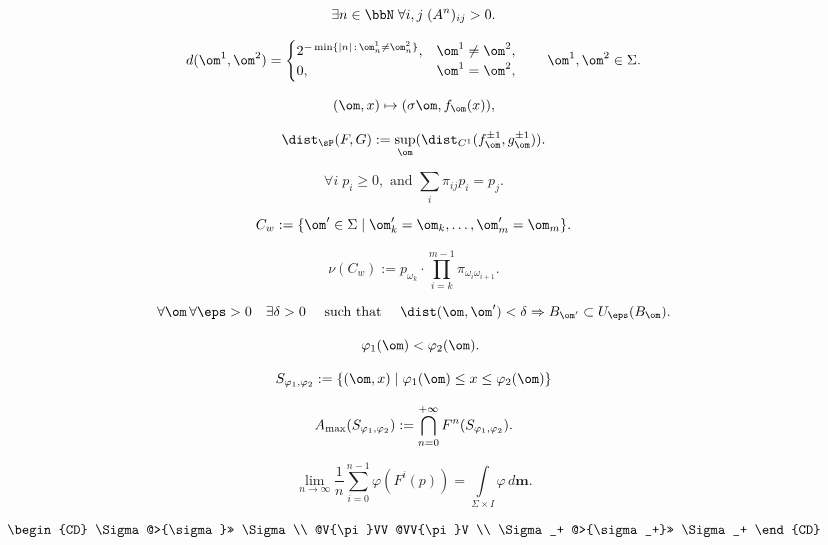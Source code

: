 \documentclass[a4paper,12pt]{article}
\begin{document}
$$
\exists n \in \bbN \; \forall i,j \; (A^n)_{ij} > 0.
$$

\begin{equation}    \label{e:markov_metric}
d (\om^1, \om^2) = \begin{cases}
2^{-\min\{|n| \, : \, \om_n^1\neq \om_n^2 \}}, &  \om^1 \neq \om^2, \\
0, &   \om^1 = \om^2,
\end{cases}
\qquad \om^1,\om^2 \in \Sigma.
\end{equation}

$$
(\om, x) \mapsto (\sigma \om, f_{\om} (x)),
$$

$$
\dist_\sP (F,G) := \sup_\om (\dist_{C^1} (f_\om^{\pm 1}, g_\om^{\pm 1})).
$$

\begin{equation}    \label{e:vector_p}
\forall i \; p_i \ge 0, \text{ and } \sum_i \pi_{ij} p_i = p_j.
\end{equation}

$$
C_w := \{ \om' \in \Sigma \mid \om_k' = \om_k, \ldots, \om_m' = \om_m \}.
$$

\begin{equation}    \label{e:markov_measure}
\nu(C_w) := p_{\omega_{k}} \cdot \prod\limits_{i=k}^{m-1} \pi_{\omega_{i} \omega_{i+1}}.
\end{equation}

$$
\forall \om \, \forall \eps > 0 \quad \exists \delta > 0 \quad \text{ such that } \quad \dist(\om, \om') < \delta \Rightarrow B_{\om'} \subset U_\eps (B_\om).
$$

$$
\quad \varphi_1(\om) < \varphi_2 (\om).
$$

$$
S_{\varphi_1, \varphi_2} := \{ (\om,x) \mid \varphi_1(\om) \le x \le \varphi_2(\om) \}
$$

\begin{equation}    \label{e:Amax}
A_{\textup{max}}(S_{\varphi_1, \varphi_2}) := \bigcap_{n=0}^{+\infty} F^n (S_{\varphi_1, \varphi_2}).
\end{equation}

$$
\lim\limits_{n\to\infty} \frac{1}{n}\sum_{i=0}^{n-1} \varphi (F^i(p)) = \int\limits_{\Sigma\times I} \varphi \, d\mathbf{m}.
$$

\begin{equation}\label{e:factor}
\begin{CD}
\Sigma @>{\sigma}>> \Sigma \\
@V{\pi}VV            @VV{\pi}V \\
\Sigma_+ @>{\sigma_+}>> \Sigma_+
\end{CD}
\end{equation}
\end{document}
